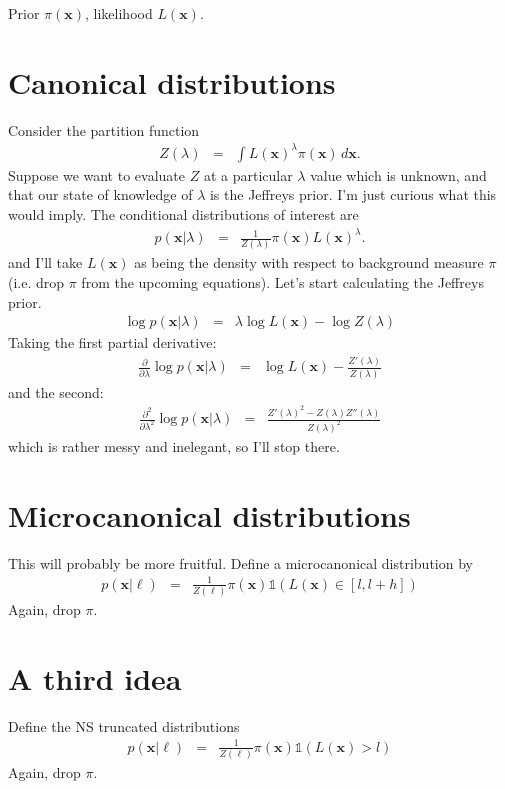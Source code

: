 \documentclass[a4paper, 11pt]{article}
\title{}
\author{}
\newcommand{\xx}{\boldsymbol{x}}	%
\begin{document}
\maketitle

Prior $\pi(\xx)$, likelihood $L(\xx)$.

\section{Canonical distributions}
Consider the partition function
\begin{eqnarray}
Z(\lambda) &=& \int L(\xx)^\lambda \pi(\xx) \, d\xx.
\end{eqnarray}
Suppose we want to evaluate $Z$ at a particular $\lambda$ value which is
unknown, and that our state of knowledge of $\lambda$ is the Jeffreys prior.
I'm just curious what this would imply. The conditional distributions of
interest are
\begin{eqnarray}
p(\xx | \lambda) &=& \frac{1}{Z(\lambda)}\pi(\xx)L(\xx)^\lambda.
\end{eqnarray}
and I'll take $L(\xx)$ as being the density with respect to background measure
$\pi$ (i.e. drop $\pi$ from the upcoming equations).
Let's start calculating the Jeffreys prior.
\begin{eqnarray}
\log p(\xx | \lambda) &=&  \lambda \log L(\xx) - \log Z(\lambda)
\end{eqnarray}
Taking the first partial derivative:
\begin{eqnarray}
\frac{\partial}{\partial \lambda}
\log p(\xx | \lambda) &=& \log L(\xx) - \frac{Z'(\lambda)}{Z(\lambda)}
\end{eqnarray}
and the second:
\begin{eqnarray}
\frac{\partial^2}{\partial \lambda^2}
\log p(\xx | \lambda) &=& \frac{Z'(\lambda)^2 - Z(\lambda)Z''(\lambda)}{Z(\lambda)^2}
\end{eqnarray}
which is rather messy and inelegant, so I'll stop there.

\section{Microcanonical distributions}
This will probably be more fruitful. Define a microcanonical distribution by
\begin{eqnarray}
p(\xx | \ell) &=& \frac{1}{Z(\ell)}\pi(\xx)\mathds{1}
\left(L(\xx) \in [l, l + h]\right)
\end{eqnarray}
Again, drop $\pi$. 


\section{A third idea}
Define the NS truncated distributions
\begin{eqnarray}
p(\xx | \ell) &=& \frac{1}{Z(\ell)}\pi(\xx)\mathds{1}
\left(L(\xx) > l\right)
\end{eqnarray}
Again, drop $\pi$. 
\end{document}

